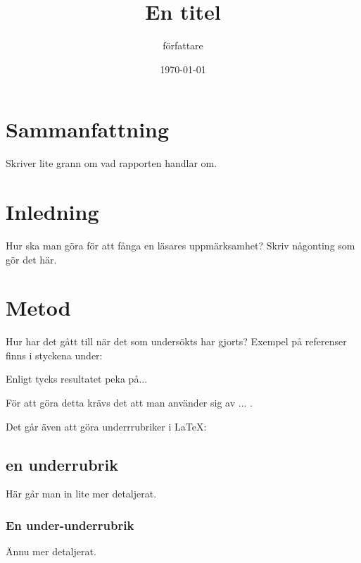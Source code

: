 \documentclass[12pt, a4paper]{article}
\title{En titel}
\author{författare}
\date{\today}
\begin{document}

\maketitle
\newpage
\tableofcontents
\newpage


\section{Sammanfattning}

Skriver lite grann om vad rapporten handlar om.

\section{Inledning}

Hur ska man göra för att fånga en läsares uppmärksamhet? Skriv någonting som gör det här.

\section{Metod}

Hur har det gått till när det som undersökts har gjorts? Exempel på referenser finns i styckena under:

Enligt \textcite{presentation} tycks resultatet peka på...

För att göra detta krävs det att man använder sig av ... \parencite{presentation}.

Det går även att göra underrrubriker i \LaTeX:

\subsection{en underrubrik}
Här går man in lite mer detaljerat.

\subsubsection{En under-underrubrik}
Ännu mer detaljerat.
\end{document}
